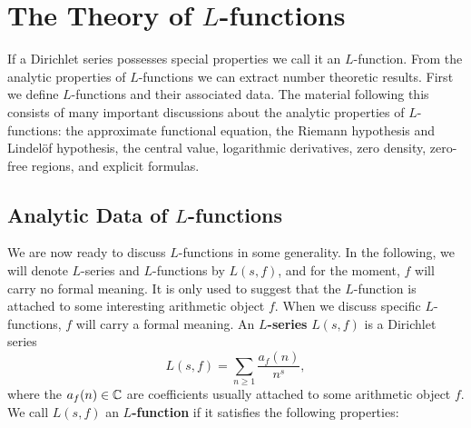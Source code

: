 \chapter{The Theory of \texorpdfstring{$L$}{L}-functions}
  If a Dirichlet series possesses special properties we call it an $L$-function. From the analytic properties of $L$-functions we can extract number theoretic results. First we define $L$-functions and their associated data. The material following this consists of many important discussions about the analytic properties of $L$-functions: the approximate functional equation, the Riemann hypothesis and Lindel\"of hypothesis, the central value, logarithmic derivatives, zero density, zero-free regions, and explicit formulas.
  \section{Analytic Data of \texorpdfstring{$L$}{L}-functions}
    We are now ready to discuss $L$-functions in some generality. In the following, we will denote $L$-series and $L$-functions by $L(s,f)$, and for the moment, $f$ will carry no formal meaning. It is only used to suggest that the $L$-function is attached to some interesting arithmetic object $f$. When we discuss specific $L$-functions, $f$ will carry a formal meaning. An \textbf{$L$-series} $L(s,f)$ is a Dirichlet series
    \[
      L(s,f) = \sum_{n \ge 1}\frac{a_{f}(n)}{n^{s}},
    \]
    where the $a_{f}(n) \in \mathbb{C}$ are coefficients usually attached to some arithmetic object $f$. We call $L(s,f)$ an \textbf{$L$-function} if it satisfies the following properties:
